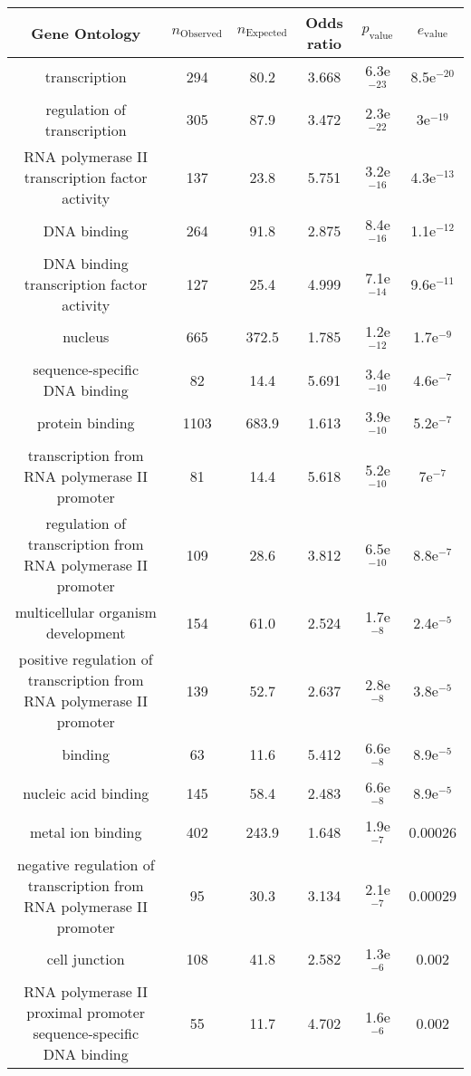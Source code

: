 \documentclass[USLetter,5pt]{article}
\begin{document}
\begin{table}[ht]
\centering
\begin{adjustbox}{width = 1\textwidth}
\small\begin{tabular}{|c|c|c|c|c|c|}
\hline
Gene Ontology & $n_{\mathrm{Observed}}$ & $n_{\mathrm{Expected}}$ & Odds ratio & $p_{\mathrm{value}}$ & $e_{\mathrm{value}}$\\
\hline
transcription & 294 &   80.2 &  3.668 & 6.3e$^{-23}$ & 8.5e$^{-20}$\\
regulation of transcription & 305 &   87.9 &  3.472 & 2.3e$^{-22}$ &  3e$^{-19}$\\
RNA polymerase II transcription factor activity & 137 &   23.8 &  5.751 & 3.2e$^{-16}$ & 4.3e$^{-13}$\\
DNA binding & 264 &   91.8 &  2.875 & 8.4e$^{-16}$ & 1.1e$^{-12}$\\
DNA binding transcription factor activity & 127 &   25.4 &  4.999 & 7.1e$^{-14}$ & 9.6e$^{-11}$\\
nucleus & 665 &  372.5 &  1.785 & 1.2e$^{-12}$ & 1.7e$^{-9}$\\
sequence-specific DNA binding & 82 &   14.4 &  5.691 & 3.4e$^{-10}$ & 4.6e$^{-7}$\\
protein binding & 1103 &  683.9 &  1.613 & 3.9e$^{-10}$ & 5.2e$^{-7}$\\
transcription from RNA polymerase II promoter & 81 &   14.4 &  5.618 & 5.2e$^{-10}$ &   7e$^{-7}$\\
regulation of transcription from RNA polymerase II promoter & 109 &   28.6 &  3.812 & 6.5e$^{-10}$ & 8.8e$^{-7}$\\
multicellular organism development & 154 &   61.0 &  2.524 & 1.7e$^{-8}$ & 2.4e$^{-5}$\\
positive regulation of transcription from RNA polymerase II promoter & 139 &   52.7 &  2.637 & 2.8e$^{-8}$ & 3.8e$^{-5}$\\
binding & 63 &   11.6 &  5.412 & 6.6e$^{-8}$ & 8.9e$^{-5}$\\
nucleic acid binding & 145 &   58.4 &  2.483 & 6.6e$^{-8}$ & 8.9e$^{-5}$\\
metal ion binding & 402 &  243.9 &  1.648 & 1.9e$^{-7}$ & 0.00026\\
negative regulation of transcription from RNA polymerase II promoter & 95 &   30.3 &  3.134 & 2.1e$^{-7}$ & 0.00029\\
cell junction & 108 &   41.8 &  2.582 & 1.3e$^{-6}$ &  0.002\\
RNA polymerase II proximal promoter sequence-specific DNA binding & 55 &   11.7 &  4.702 & 1.6e$^{-6}$ &  0.002\\

\end{tabular}
\end{adjustbox}
\end{table}
\end{document}
